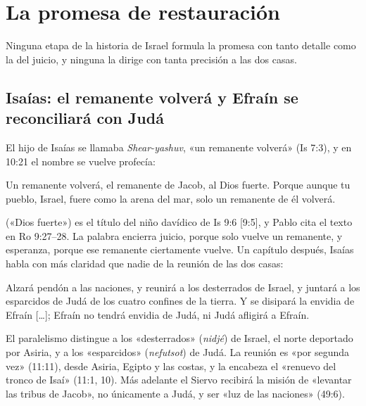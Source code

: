 \section{La promesa de restauración}

Ninguna etapa de la historia de Israel formula la promesa con tanto detalle como la del juicio, y ninguna la dirige con tanta precisión a las dos casas.

\subsection{Isaías: el remanente volverá y Efraín se reconciliará con Judá}
El hijo de Isaías se llamaba \emph{Shear-yashuv}, «un remanente volverá» (Is 7:3), y en 10:21 el nombre se vuelve profecía:
\begin{cita}Un remanente volverá, el remanente de Jacob, al Dios fuerte. Porque aunque tu pueblo, Israel, fuere como la arena del mar, solo un remanente de él volverá.\end{cita}
 («Dios fuerte») es el título del niño davídico de Is 9:6 [9:5], y Pablo cita el texto en Ro 9:27--28. La palabra encierra juicio, porque solo vuelve un remanente, y esperanza, porque ese remanente ciertamente vuelve. Un capítulo después, Isaías habla con más claridad que nadie de la reunión de las dos casas:
\begin{cita}Alzará pendón a las naciones, y reunirá a los desterrados de Israel, y juntará a los esparcidos de Judá de los cuatro confines de la tierra. Y se disipará la envidia de Efraín [\ldots]; Efraín no tendrá envidia de Judá, ni Judá afligirá a Efraín.\end{cita}
El paralelismo distingue a los «desterrados» (\emph{nidjé}) de Israel, el norte deportado por Asiria, y a los «esparcidos» (\emph{nefutsot}) de Judá. La reunión es «por segunda vez» (11:11), desde Asiria, Egipto y las costas, y la encabeza el «renuevo del tronco de Isaí» (11:1, 10). Más adelante el Siervo recibirá la misión de «levantar las tribus de Jacob», no únicamente a Judá, y ser «luz de las naciones» (49:6).

